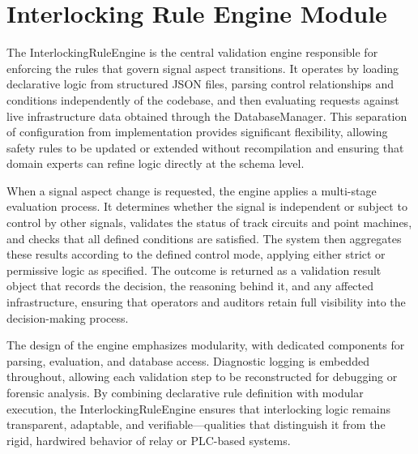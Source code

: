 \section{Interlocking Rule Engine Module}
\label{sec:methodology:rule-engine}

The InterlockingRuleEngine is the central validation engine responsible for enforcing the rules that govern signal aspect transitions. It operates by loading declarative logic from structured JSON files, parsing control relationships and conditions independently of the codebase, and then evaluating requests against live infrastructure data obtained through the DatabaseManager. This separation of configuration from implementation provides significant flexibility, allowing safety rules to be updated or extended without recompilation and ensuring that domain experts can refine logic directly at the schema level.

When a signal aspect change is requested, the engine applies a multi-stage evaluation process. It determines whether the signal is independent or subject to control by other signals, validates the status of track circuits and point machines, and checks that all defined conditions are satisfied. The system then aggregates these results according to the defined control mode, applying either strict or permissive logic as specified. The outcome is returned as a validation result object that records the decision, the reasoning behind it, and any affected infrastructure, ensuring that operators and auditors retain full visibility into the decision-making process.

The design of the engine emphasizes modularity, with dedicated components for parsing, evaluation, and database access. Diagnostic logging is embedded throughout, allowing each validation step to be reconstructed for debugging or forensic analysis. By combining declarative rule definition with modular execution, the InterlockingRuleEngine ensures that interlocking logic remains transparent, adaptable, and verifiable—qualities that distinguish it from the rigid, hardwired behavior of relay or PLC-based systems.